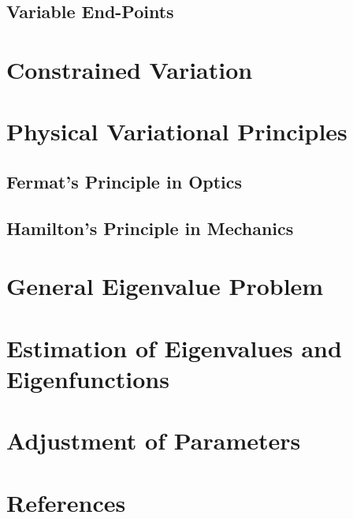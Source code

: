 \documentclass[]{article}
\begin{document}
\subsection{Variable End-Points}
\section{Constrained Variation}
\section{Physical Variational Principles}
\subsection{Fermat's Principle in Optics}
\subsection{Hamilton's Principle in Mechanics}
\section{General Eigenvalue Problem}
\section{Estimation of Eigenvalues and Eigenfunctions}
\section{Adjustment of Parameters}
\section*{References}
\end{document}
